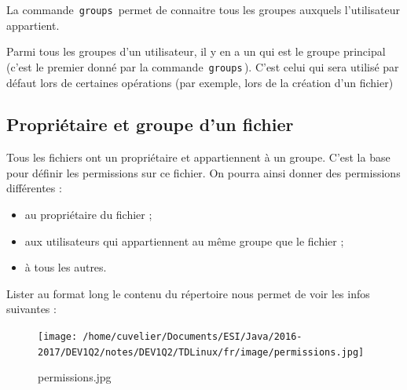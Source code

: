 \documentclass[11pt,a4paper]{article}
\begin{document}
            \par
        
				  La commande \,\verb|groups|\, permet de connaitre tous les groupes 
				  auxquels l'utilisateur appartient.
				
            \par
        
				  Parmi tous les groupes d'un utilisateur, il y en a un qui est le groupe principal (c'est le premier donn\'e par la commande \,\verb|groups|\,). 
				  C'est celui qui sera utilis\'e par d\'efaut lors de certaines op\'erations (par exemple, lors de la cr\'eation d'un fichier)
				
            \par
        \subsection{Propri\'etaire et groupe d'un fichier}
					Tous les fichiers ont un propri\'etaire et appartiennent \`a un groupe.
					C'est la base pour d\'efinir les permissions sur ce fichier.
					On pourra ainsi donner des permissions diff\'erentes :
					
					\begin{itemize}
				
			\item au propri\'etaire du fichier ;
			\item aux utilisateurs qui appartiennent au m\^eme groupe que le fichier ;
			\item  \`a tous les autres. 
					\end{itemize}
				
            \par
        
				  Lister au format long le contenu du r\'epertoire nous permet de voir les infos suivantes :
				
            \par
        \begin{figure}[hbt]
				    \begin{center}
					\texttt{[image: /home/cuvelier/Documents/ESI/Java/2016-2017/DEV1Q2/notes/DEV1Q2/TDLinux/fr/image/permissions.jpg]}
						\end{center}
                
                    \caption[permissions.jpg]{permissions.jpg}
                \end{figure}
                    
            \par
        
\end{document}
